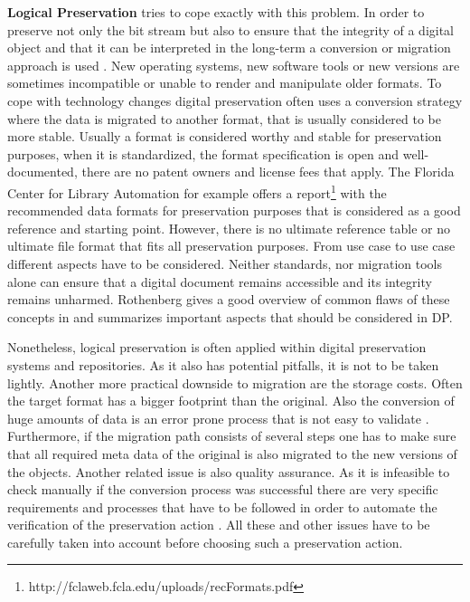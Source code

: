 \textbf{Logical Preservation} tries to cope exactly with this problem. In order to preserve not only the bit stream but also to ensure that the integrity of a digital object and that it can be interpreted in the long-term a conversion or migration approach is used \cite{Lee:2002:SOTADP}. New operating systems, new software tools or new versions are sometimes incompatible or unable to render and manipulate older formats. To cope with technology changes digital preservation often uses a conversion strategy where the data is migrated to another format, that is usually considered to be more stable. Usually a format is considered worthy and stable for preservation purposes, when it is standardized, the format specification is open and well-documented, there are no patent owners and license fees that apply. The Florida Center for Library Automation for example offers a report\footnote{http://fclaweb.fcla.edu/uploads/recFormats.pdf} with the recommended data formats for preservation purposes that is considered as a good reference and starting point. However, there is no ultimate reference table or no ultimate file format that fits all preservation purposes. From use case to use case different aspects have to be considered. Neither standards, nor migration tools alone can ensure that a digital document remains accessible and its integrity remains unharmed. Rothenberg gives a good overview of common flaws of these concepts in \cite{rothenberg:1999:ensuring} and summarizes important aspects that should be considered in DP.

Nonetheless, logical preservation is often applied within digital preservation systems and repositories. As it also has potential pitfalls, it is not to be taken lightly.
Another more practical downside to migration are the storage costs. Often the target format has a bigger footprint than the original. Also the conversion of huge amounts of data is an error prone process that is not easy to validate \cite{Lorie:2001:LTP:379437.379726}. Furthermore, if the migration path consists of several steps one has to make sure that all required meta data of the original is also migrated to the new versions of the objects. Another related issue is also quality assurance. As it is infeasible to check manually if the conversion process was successful there are very specific requirements and processes that have to be followed in order to automate the verification of the preservation action \cite{feng:2010:qrofm}.
All these and other issues have to be carefully taken into account before choosing such a preservation action.
\newline

